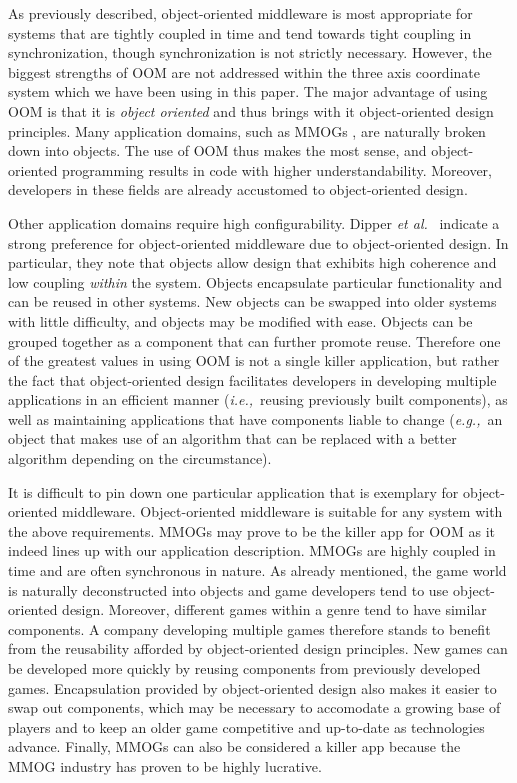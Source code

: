 \documentclass{acm_proc_article-sp}
\def\eg{{\it e.g.,\/}}
\def\ie{{\it i.e.,\/}}
\def\etal{{\it et al.\/}}
\begin{document}
As previously described, object-oriented middleware is most appropriate for systems that are tightly coupled in time and tend towards tight coupling in synchronization, though synchronization is not strictly necessary.  However, the biggest strengths of OOM are not addressed within the three axis coordinate system which we have been using in this paper.  The major advantage of using OOM is that it is \textit{object oriented} and thus brings with it object-oriented design principles.  Many application domains, such as MMOGs \cite{Denault:2008p8364}, are naturally broken down into objects.  The use of OOM thus makes the most sense, and object-oriented programming results in code with higher understandability.  Moreover, developers in these fields are already accustomed to object-oriented design.

Other application domains require high configurability. Dipper \etal\ \cite{Dipper:2004p8366} indicate a strong preference for object-oriented middleware due to object-oriented design.  In particular, they note that objects allow design that exhibits high coherence and low coupling \textit{within} the system.  Objects encapsulate particular functionality and can be reused in other systems.  New objects can be swapped into older systems with little difficulty, and objects may be modified with ease.  Objects can be grouped together as a component that can further promote reuse.  Therefore one of the greatest values in using OOM is not a single killer application, but rather the fact that object-oriented design facilitates developers in developing multiple applications in an efficient manner (\ie\ reusing previously built components), as well as maintaining applications that have components liable to change (\eg\ an object that makes use of an algorithm that can be replaced with a better algorithm depending on the circumstance).

It is difficult to pin down one particular application that is exemplary for object-oriented middleware.  Object-oriented middleware is suitable for any system with the above requirements.  MMOGs may prove to be the killer app for OOM as it indeed lines up with our application description.  MMOGs are highly coupled in time and are often synchronous in nature.  As already mentioned, the game world is naturally deconstructed into objects and game developers tend to use object-oriented design.  Moreover, different games within a genre tend to have similar components.  A company developing multiple games therefore stands to benefit from the reusability afforded by object-oriented design principles.  New games can be developed more quickly by reusing components from previously developed games.  Encapsulation provided by object-oriented design also makes it easier to swap out components, which may be necessary to accomodate a growing base of players and to keep an older game competitive and up-to-date as technologies advance.  Finally, MMOGs can also be considered a killer app because the MMOG industry has proven to be highly lucrative.
\end{document}
